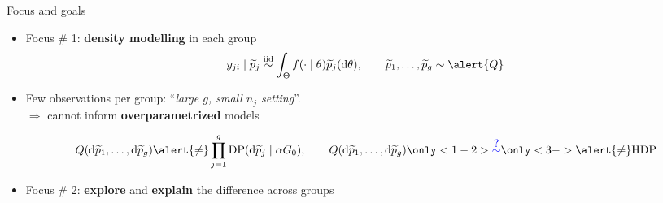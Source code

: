 \documentclass[10.5pt, aspectratio=169]{beamer} %
\newcommand{\iid}{\stackrel{\mbox{\scriptsize iid}}{\sim}}
\newcommand{\ptilde}{\widetilde{p}}
\newcommand{\dd}{\mathrm d}
\begin{document}
\begin{frame}{Focus and goals}


\begin{itemize}[<+->]
	\item Focus \# 1: \textbf{density modelling} in each group 
\begin{equation*}
	y_{ji} \mid \ptilde_j \iid \int_\Theta f(\cdot \mid \theta) \ptilde_j(\dd \theta), \qquad
	\ptilde_1, \ldots, \ptilde_g  \sim  \alert{Q}
\end{equation*}
	
	\item Few observations per group: ``\emph{large $g$, small $n_j$ setting}''. \\ $\Longrightarrow$ cannot inform \textbf{overparametrized} models
		
	
	\begin{equation*}
		Q(\dd \ptilde_1, \ldots, \dd \ptilde_g) \alert{\neq} \prod_{j=1}^g \mathrm{DP}(\dd \ptilde_j \mid \alpha G_0), \qquad 
		Q(\dd \ptilde_1, \ldots, \dd \ptilde_g) \only<1-2>{\textcolor{blue}{\stackrel{\mbox{?}}{\sim}}} \only<3->{\alert{\neq}} \mathrm{HDP}
	\end{equation*}

	
	\item Focus \# 2: \textbf{explore} and \textbf{explain} the difference across groups 
	
\end{itemize}
\end{frame}
\end{document}
